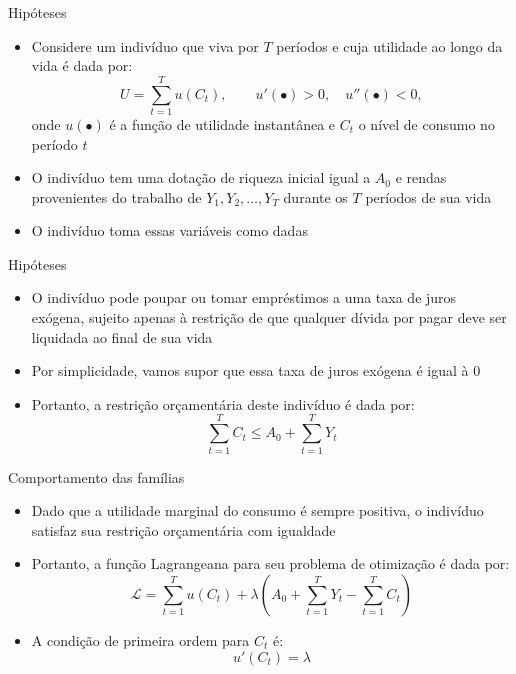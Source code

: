 \documentclass[10pt]{beamer}
\begin{document}
\begin{frame}{Hipóteses}
    \begin{itemize}
        \item Considere um indivíduo que viva por $T$ períodos e cuja utilidade ao longo da vida é dada por:
        \begin{equation}
            U = \sum_{t=1}^T u(C_t), \qquad u'(\bullet)>0, \quad u''(\bullet)<0,
            \label{eq2}
        \end{equation}
        onde $u(\bullet)$ é a função de utilidade instantânea e $C_t$ o nível de consumo no período $t$
        \bigskip
        \item O indivíduo tem uma dotação de riqueza inicial igual a $A_0$ e rendas provenientes do trabalho de $Y_1, Y_2, \dots, Y_T$ durante os $T$ períodos de sua vida
        \bigskip
        \item O indivíduo toma essas variáveis como dadas
    \end{itemize}
\end{frame}

\begin{frame}{Hipóteses}
    \begin{itemize}
        \item O indivíduo pode poupar ou tomar empréstimos a uma taxa de juros exógena, sujeito apenas à restrição de que qualquer dívida por pagar deve ser liquidada ao final de sua vida
        \bigskip
        \item Por simplicidade, vamos supor que essa taxa de juros exógena é igual à 0
        \bigskip
        \item Portanto, a restrição orçamentária deste indivíduo é dada por:
        \begin{equation}
            \sum_{t=1}^T C_t \leq A_0 + \sum_{t=1}^T Y_t
            \label{eq3}
        \end{equation}
    \end{itemize}
\end{frame}

\begin{frame}{Comportamento das famílias}
    \begin{itemize}
        \item Dado que a utilidade marginal do consumo é sempre positiva, o indivíduo satisfaz sua restrição orçamentária com igualdade
        \bigskip
        \item Portanto, a função Lagrangeana para seu problema de otimização é dada por:
        \begin{equation}
            \mathcal{L} = \sum_{t=1}^T u(C_t) + \lambda\left(A_0 + \sum_{t=1}^T Y_t - \sum_{t=1}^T C_t\right)
            \label{eq4}
        \end{equation}
        \bigskip
        \item A condição de primeira ordem para $C_t$ é:
        \begin{equation}
            u'(C_t) = \lambda \label{eq5}
        \end{equation}
    \end{itemize}
\end{frame}
\end{document}
